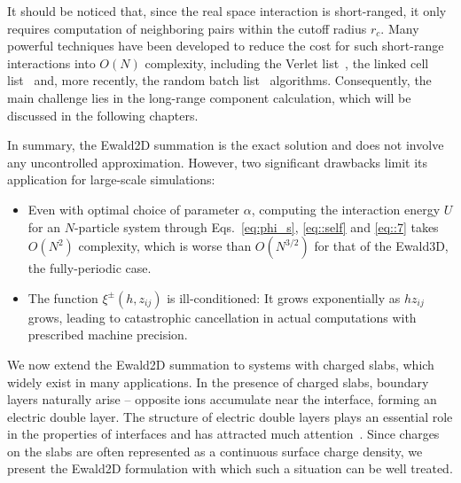 It should be noticed that, since the real space interaction is short-ranged, it only requires computation of neighboring pairs within the cutoff radius $r_c$. 
Many powerful techniques have been developed to reduce the cost for such short-range interactions into $O(N)$ complexity, including the Verlet list~\cite{verlet1967computer}, the linked cell list~\cite{allen2017computer} and, more recently, the random batch list~\cite{liang2021random} algorithms. 
Consequently, the main challenge lies in the long-range component calculation, which will be discussed in the following chapters.

In summary, the Ewald2D summation is the exact solution and does not involve any uncontrolled approximation. 
However, two significant drawbacks limit its application for large-scale simulations:
\begin{itemize}
	\item Even with optimal choice of parameter $\alpha$, computing the interaction energy $U$ for an $N$-particle system through Eqs.~\eqref{eq:phi_s}, \eqref{eq::self} and \eqref{eq::7} takes $O(N^2)$ complexity, which is worse than $O(N^{3/2})$ for that of the Ewald3D, the fully-periodic case.
	\item The function $\xi^{\pm}(h, z_{ij})$ is ill-conditioned: It grows exponentially as $h z_{ij}$ grows, leading to catastrophic cancellation in actual computations with prescribed machine precision.
\end{itemize}


We now extend the Ewald2D summation to systems with charged slabs, which widely exist in many applications.
In the presence of charged slabs, boundary layers naturally arise -- opposite ions accumulate near the interface, forming an electric double layer. The structure of electric double layers plays an essential role in the properties of interfaces and has attracted much attention~\cite{messina2004effect,breitsprecher2014coarse,moreira2002simulations}. Since charges on the slabs are often represented as a continuous surface charge density, we present the Ewald2D formulation with which such a situation can be well treated.

